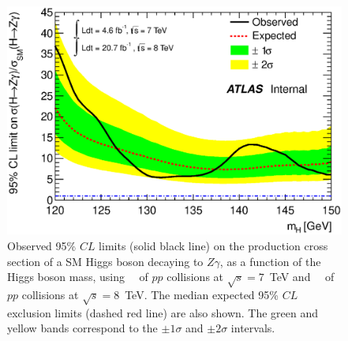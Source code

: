 \begin{figure}[!htbp]
\centering
\includegraphics[totalheight=9cm,angle=0]{figures/plot_smooth_cls}
\caption{Observed 95\% $CL$ limits (solid black line) 
  on the production cross section of a SM Higgs boson 
  decaying to $Z\gamma$, as a function of the Higgs boson 
  mass, using \lumiseventev~\ifb\ of $pp$
  collisions at $\sqrt{s}=7$~TeV and \lumieighttev~\ifb\ of $pp$
  collisions at $\sqrt{s}=8$~TeV.
  The median expected 95\% $CL$ exclusion limits (dashed red line)
  are also shown. The green and yellow bands correspond to the $\pm 1\sigma$ 
  and $\pm2\sigma$ intervals.
}
\label{fig:ExpectedExclusion_1}
\end{figure}
